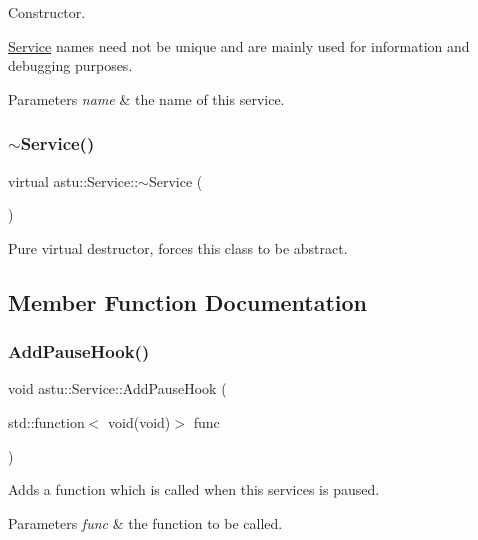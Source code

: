 Constructor.

\hyperlink{classastu_1_1Service}{Service} names need not be unique and are mainly used for information and debugging purposes.


\begin{DoxyParams}{Parameters}
{\em name} & the name of this service. \\
\hline
\end{DoxyParams}
\mbox{\label{classastu_1_1Service_aa5b2642db2ba704a5a33d0ec7735cfca}} 
\subsubsection{\texorpdfstring{$\sim$\+Service()}{~Service()}}
{\footnotesize\ttfamily virtual astu\+::\+Service\+::$\sim$\+Service (\begin{DoxyParamCaption}{ }\end{DoxyParamCaption})\hspace{0.3cm}{\ttfamily [pure virtual]}}

Pure virtual destructor, forces this class to be abstract. 

\subsection{Member Function Documentation}
\mbox{\label{classastu_1_1Service_a362265b0bb1d26f9a18c882a9c6985bb}} 
\subsubsection{\texorpdfstring{Add\+Pause\+Hook()}{AddPauseHook()}}
{\footnotesize\ttfamily void astu\+::\+Service\+::\+Add\+Pause\+Hook (\begin{DoxyParamCaption}\item[{std\+::function$<$ void(void)$>$}]{func }\end{DoxyParamCaption})}

Adds a function which is called when this services is paused.


\begin{DoxyParams}{Parameters}
{\em func} & the function to be called. \\
\hline
\end{DoxyParams}
\mbox{\label{classastu_1_1Service_a5c7ab8ad94185d1a30e04a84afbfa6c6}} 

